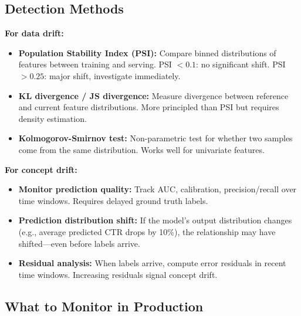 \subsection{Detection Methods}

\textbf{For data drift:}
\begin{itemize}
    \item \textbf{Population Stability Index (PSI):} Compare binned distributions of features between training and serving. PSI $< 0.1$: no significant shift. PSI $> 0.25$: major shift, investigate immediately.
    \item \textbf{KL divergence / JS divergence:} Measure divergence between reference and current feature distributions. More principled than PSI but requires density estimation.
    \item \textbf{Kolmogorov-Smirnov test:} Non-parametric test for whether two samples come from the same distribution. Works well for univariate features.
\end{itemize}

\textbf{For concept drift:}
\begin{itemize}
    \item \textbf{Monitor prediction quality:} Track AUC, calibration, precision/recall over time windows. Requires delayed ground truth labels.
    \item \textbf{Prediction distribution shift:} If the model's output distribution changes (e.g., average predicted CTR drops by 10\%), the relationship may have shifted---even before labels arrive.
    \item \textbf{Residual analysis:} When labels arrive, compute error residuals in recent time windows. Increasing residuals signal concept drift.
\end{itemize}

\subsection{What to Monitor in Production}

